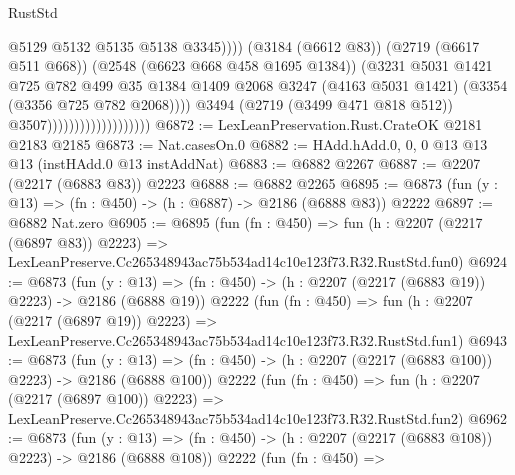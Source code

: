 \begin{lexlean}{RustStd}
\begin{coremodule}
                                                    @5129
                                                    @5132
                                                    @5135
                                                    @5138
                                                    @3345))))
                                            (@3184 (@6612 @83))
                                            (@2719 (@6617 @511 @668))
                                            (@2548 (@6623 @668 @458 @1695 @1384))
                                            (@3231
                                              @5031
                                              @1421
                                              @725
                                              @782
                                              @499
                                              @35
                                              @1384
                                              @1409
                                              @2068
                                              @3247
                                              (@4163 @5031 @1421)
                                              (@3354 (@3356 @725 @782 @2068))))
                                          @3494
                                          (@2719 (@3499 @471 @818 @512))
                                          @3507)))))))))))))))))))
@6872 := LexLeanPreservation.Rust.CrateOK @2181 @2183 @2185
@6873 := Nat.casesOn.{0}
@6882 := HAdd.hAdd.{0, 0, 0} @13 @13 @13 (instHAdd.{0} @13 instAddNat)
@6883 := @6882 @2267
@6887 := @2207 (@2217 (@6883 @83)) @2223
@6888 := @6882 @2265
@6895 := @6873 (fun (y : @13) => (fn : @450) -> (h : @6887) -> @2186 (@6888 @83)) @2222
@6897 := @6882 Nat.zero
@6905 := @6895
    (fun (fn : @450) =>
    fun (h : @2207 (@2217 (@6897 @83)) @2223) =>
    LexLeanPreserve.Cc265348943ac75b534ad14c10e123f73.R32.RustStd.fun0)
@6924 := @6873
    (fun (y : @13) => (fn : @450) -> (h : @2207 (@2217 (@6883 @19)) @2223) -> @2186 (@6888 @19))
    @2222
    (fun (fn : @450) =>
    fun (h : @2207 (@2217 (@6897 @19)) @2223) =>
    LexLeanPreserve.Cc265348943ac75b534ad14c10e123f73.R32.RustStd.fun1)
@6943 := @6873
    (fun (y : @13) => (fn : @450) -> (h : @2207 (@2217 (@6883 @100)) @2223) -> @2186 (@6888 @100))
    @2222
    (fun (fn : @450) =>
    fun (h : @2207 (@2217 (@6897 @100)) @2223) =>
    LexLeanPreserve.Cc265348943ac75b534ad14c10e123f73.R32.RustStd.fun2)
@6962 := @6873
    (fun (y : @13) => (fn : @450) -> (h : @2207 (@2217 (@6883 @108)) @2223) -> @2186 (@6888 @108))
    @2222
    (fun (fn : @450) =>

\end{coremodule}
\end{lexlean}
